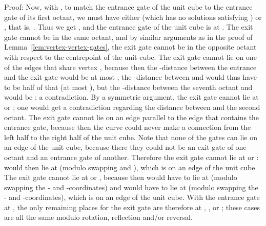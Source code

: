 \documentclass[11pt,a4paper]{article}
\newenvironment{proof}{Proof:}{\qed}
\def\squareforqed{\hbox{\rlap{}}}
\def\qed{\ifmmode\squareforqed\else{\unskip\nobreak\hfil
\penalty50\hskip1em\null\nobreak\hfil\squareforqed
\parfillskip=0pt\finalhyphendemerits=0\endgraf}\fi}
\begin{document}
\begin{proof}
Now, with , to match the entrance gate of the unit cube to the entrance gate of its first octant, we must have either  (which has no solutions satisfying ) or , that is, . Thus we get , and the entrance gate of the unit cube is at . The exit gate cannot be in the same octant, and by similar arguments as in the proof of Lemma~\ref{lem:vertex-vertex-gates}, the exit gate cannot be in the opposite octant with respect to the centrepoint of the unit cube. The exit gate cannot lie on one of the edges that share vertex , because then the -distance between the entrance and the exit gate would be at most ; the -distance between  and  would thus have to be half of that (at most ), but the -distance between the seventh octant and  would be : a contradiction. By a symmetric argument, the exit gate cannot lie at  or ; one would get a contradiction regarding the distance between  and the second octant. The exit gate cannot lie on an edge parallel to the edge that contains the entrance gate, because then the curve could never make a connection from the left half to the right half of the unit cube. Note that none of the gates  can lie on an edge of the unit cube, because there they could not be an exit gate of one octant and an entrance gate of another. Therefore the exit gate cannot lie at  or :  would then lie at  (modulo swapping  and ), which is on an edge of the unit cube. The exit gate cannot lie at  or , because then  would have to lie at  (modulo swapping the - and -coordinates) and  would have to lie at  (modulo swapping the - and -coordinates), which is on an edge of the unit cube. With the entrance gate at , the only remaining places for the exit gate are therefore at , ,  or ; these cases are all the same modulo rotation, reflection and/or reversal.
\end{proof}
\end{document}
